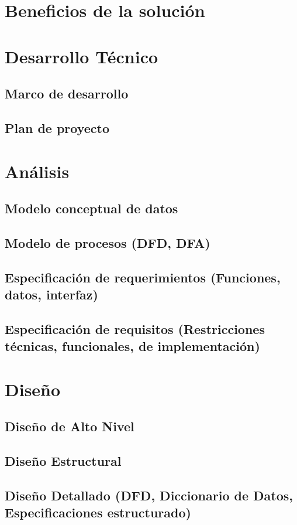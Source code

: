 \documentclass[letterpaper,openright,10pt,twoside]{report}
\begin{document}
		\section{Beneficios de la solución}
		\section{Desarrollo Técnico}
			\subsection{Marco de desarrollo}
			\subsection{Plan de proyecto}
		\section{Análisis}
			\subsection{Modelo conceptual de datos}
			\subsection{Modelo de procesos (DFD, DFA)}
			\subsection{Especificación de requerimientos (Funciones, datos, interfaz)}
			\subsection{Especificación de requisitos (Restricciones técnicas, funcionales, de implementación)}
		\section{Diseño}
			\subsection{Diseño de Alto Nivel}
			\subsection{Diseño Estructural}
			\subsection{Diseño Detallado (DFD, Diccionario de Datos, Especificaciones estructurado)}
\end{document}
